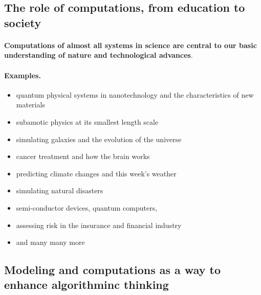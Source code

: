 \documentclass[%
oneside,                 %
final,                   %
10pt]{article}
\begin{document}
\noindent



\subsection*{The role of computations, from education to society}

\paragraph{}
\textbf{Computations of almost all systems in science are central to our
basic understanding of nature and technological advances}.



\paragraph{Examples.}
\begin{itemize}
\item quantum physical systems in nanotechnology and the characteristics of new materials

\item subamotic physics at its smallest length scale

\item simulating galaxies and the evolution of the universe

\item cancer treatment and how the brain works

\item predicting climate changes and this week's weather

\item simulating natural disasters

\item semi-conductor devices, quantum computers,

\item assessing risk in the insurance and financial industry

\item and many many more
\end{itemize}

\noindent



\subsection*{Modeling and computations as a way to enhance algorithminc thinking}
\end{document}
